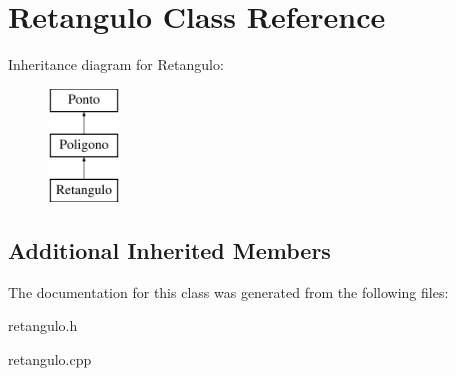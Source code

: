 \hypertarget{class_retangulo}{}\section{Retangulo Class Reference}
\label{class_retangulo}
Inheritance diagram for Retangulo\+:\begin{figure}[H]
\begin{center}
\leavevmode
\includegraphics[height=3.000000cm]{class_retangulo}
\end{center}
\end{figure}
\subsection*{Additional Inherited Members}


The documentation for this class was generated from the following files\+:\begin{DoxyCompactItemize}
\item 
retangulo.\+h\item 
retangulo.\+cpp\end{DoxyCompactItemize}
